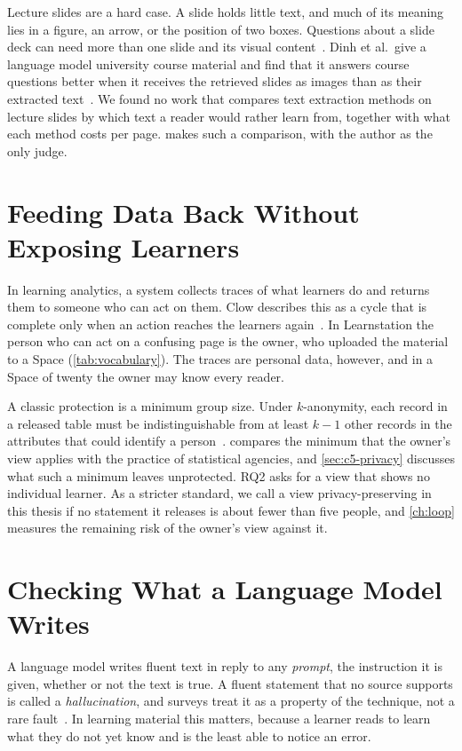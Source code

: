 Lecture slides are a hard case. A slide holds little text, and much of its
meaning lies in a figure, an arrow, or the position of two boxes. Questions
about a slide deck can need more than one slide and its visual
content~\cite{tanaka2023slidevqa}. Dinh et al.\ give a language model
university course material and find that it answers course questions better
when it receives the retrieved slides as images than as their extracted
text~\cite{dinh2025slides}. We found no work that compares text extraction
methods on lecture slides by which text a reader would rather learn from,
together with what each method costs per page.  makes such a
comparison, with the author as the only judge.

\section{Feeding Data Back Without Exposing Learners}
\label{sec:analytics-privacy}

In learning analytics, a system collects traces of what learners do and
returns them to someone who can act on them. Clow describes this as a cycle
that is complete only when an action reaches the learners
again~\cite{clow2012cycle}. In Learnstation the person who can act on a
confusing page is the owner, who uploaded the material to a Space
(\cref{tab:vocabulary}). The traces are personal data, however, and in a
Space of twenty the owner may know every reader.

A classic protection is a minimum group size. Under $k$-anonymity, each record
in a released table must be indistinguishable from at least $k-1$ other
records in the attributes that could identify a
person~\cite{sweeney2002kanonymity}.  compares the
minimum that the owner's view applies with the practice of statistical
agencies, and \cref{sec:c5-privacy}
discusses what such a minimum leaves unprotected. RQ2 asks for a view that
shows no individual learner. As a stricter standard, we call a view
privacy-preserving in this thesis if no statement it releases is about fewer
than five people, and \cref{ch:loop} measures the remaining risk of the
owner's view against it.

\section{Checking What a Language Model Writes}
\label{sec:llms}

A language model writes fluent text in reply to any \emph{prompt}, the
instruction it is given, whether or not the text is true. A
fluent statement that no source supports is called a \emph{hallucination},
and surveys treat it as a property of the technique, not a rare
fault~\cite{ji2023hallucination,huang2025hallucination}. In learning material
this matters, because a learner reads to learn what they do not yet know and
is the least able to notice an error.

